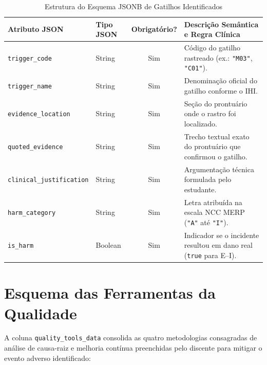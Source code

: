 \begin{table}[!ht]
\centering
\caption{Estrutura do Esquema JSONB de Gatilhos Identificados}
\label{tab_schema_gatilhos}
\footnotesize
\begin{tabularx}{\textwidth}{p{4.4cm} p{2.0cm} c X}
\toprule
\textbf{Atributo JSON} & \textbf{Tipo JSON} & \textbf{Obrigatório?} & \textbf{Descrição Semântica e Regra Clínica} \\
\midrule
\texttt{trigger\_code} & String & Sim & Código do gatilho rastreado (ex.: \texttt{"M03"}, \texttt{"C01"}). \\
\texttt{trigger\_name} & String & Sim & Denominação oficial do gatilho conforme o IHI. \\
\texttt{evidence\_location} & String & Sim & Seção do prontuário onde o rastro foi localizado. \\
\texttt{quoted\_evidence} & String & Sim & Trecho textual exato do prontuário que confirmou o gatilho. \\
\texttt{clinical\_justification} & String & Sim & Argumentação técnica formulada pelo estudante. \\
\texttt{harm\_category} & String & Sim & Letra atribuída na escala NCC MERP (\texttt{"A"} até \texttt{"I"}). \\
\texttt{is\_harm} & Boolean & Sim & Indicador se o incidente resultou em dano real (\texttt{true} para E--I). \\
\bottomrule
\end{tabularx}
\end{table}

\section{Esquema das Ferramentas da Qualidade}
\label{sec_schema_ferramentas}

A coluna \texttt{quality\_tools\_data} consolida as quatro metodologias consagradas de análise de causa-raiz e melhoria contínua preenchidas pelo discente para mitigar o evento adverso identificado:

